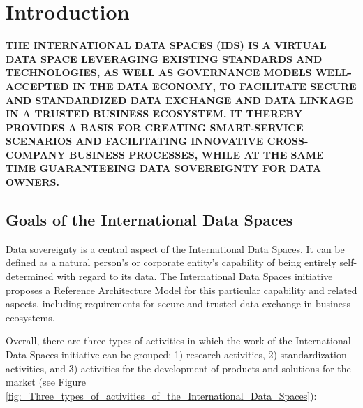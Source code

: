 

\section{Introduction}\label{sec:introduction}
\textbf{\uppercase{The International Data Spaces (IDS) is a virtual data space leveraging existing standards and technologies, as well as governance models well-accepted in the data economy, to facilitate secure and standardized data exchange and data linkage in a trusted business ecosystem. It thereby provides a basis for creating smart-service scenarios and facilitating innovative cross-company business processes, while at the same time guaranteeing data sovereignty for data owners.}}


\subsection{Goals of the International Data Spaces}\label{subsec:Goals_of_IDS}
Data sovereignty is a central aspect of the International Data Spaces. It can be defined as a natural person’s or corporate entity’s capability of being entirely self-determined with regard to its data. The International Data Spaces initiative proposes a Reference Architecture Model for this particular capability and related aspects, including requirements for secure and trusted data exchange in business ecosystems.


Overall, there are three types of activities in which the work of the International Data Spaces initiative can be grouped: 1) research activities, 2) standardization activities, and 3) activities for the development of products and solutions for the market (see Figure \ref{fig:_Three_types_of_activities_of_the_International_Data_Spaces}): 

